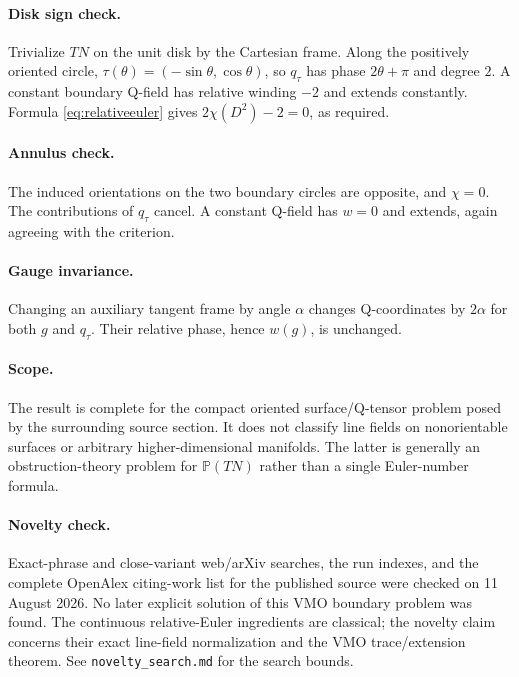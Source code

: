 \documentclass[11pt]{article}
\theoremstyle{definition}
\theoremstyle{remark}
\begin{document}
\paragraph{Disk sign check.}
Trivialize $TN$ on the unit disk by the Cartesian frame.  Along the positively
oriented circle, $\tau(\theta)=(-\sin\theta,\cos\theta)$, so $q_\tau$ has
phase $2\theta+\pi$ and degree $2$.  A constant boundary Q-field has relative
winding $-2$ and extends constantly.  Formula \eqref{eq:relativeeuler} gives
$2\chi(D^2)-2=0$, as required.

\paragraph{Annulus check.}
The induced orientations on the two boundary circles are opposite, and
$\chi=0$.  The contributions of $q_\tau$ cancel.  A constant Q-field has
$w=0$ and extends, again agreeing with the criterion.

\paragraph{Gauge invariance.}
Changing an auxiliary tangent frame by angle $\alpha$ changes Q-coordinates
by $2\alpha$ for both $g$ and $q_\tau$.  Their relative phase, hence $w(g)$,
is unchanged.

\paragraph{Scope.}
The result is complete for the compact oriented surface/Q-tensor problem
posed by the surrounding source section.  It does not classify line fields on
nonorientable surfaces or arbitrary higher-dimensional manifolds.  The latter
is generally an obstruction-theory problem for $\mathbb P(TN)$ rather than a
single Euler-number formula.

\paragraph{Novelty check.}
Exact-phrase and close-variant web/arXiv searches, the run indexes, and the
complete OpenAlex citing-work list for the published source were checked on
11 August 2026.  No later explicit solution of this VMO boundary problem was
found.  The continuous relative-Euler ingredients are classical; the novelty
claim concerns their exact line-field normalization and the VMO
trace/extension theorem.  See \texttt{novelty\_search.md} for the search
bounds.
\end{document}

